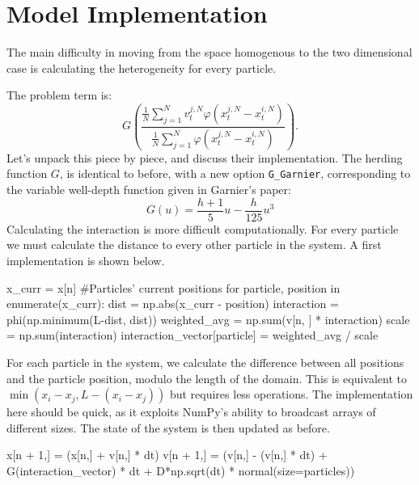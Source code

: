 \documentclass[11pt,a4paper, dvipsnames]{article}
\begin{document}
    \section{Model Implementation}
        The main difficulty in moving from the space homogenous to the two dimensional case is calculating the heterogeneity for every particle.
        
        The problem term is:
        \begin{equation}\label{interaction}
            G\left(\frac{\frac{1}{N}\sum_{j=1}^N v_t^{j,N}\varphi(x^{j,N}_t-x^{i,N}_t)}{\frac{1}{N}\sum_{j=1}^N \varphi(x^{j,N}_t-x^{i,N}_t)}\right).
        \end{equation}
        Let's unpack this piece by piece, and discuss their implementation. The herding function $G$, is identical to before, with a new option \texttt{G\_Garnier}, corresponding to the variable well-depth function given in Garnier's paper:
        $$G(u) = \frac{h+1}{5}u - \frac{h}{125} u^3$$
        Calculating the interaction is more difficult computationally. For every particle we must calculate the distance to every other particle in the system. A first implementation is shown below.

        \begin{python}
x_curr = x[n] #Particles' current positions
   for particle, position in enumerate(x_curr):
       dist = np.abs(x_curr - position)
       interaction = phi(np.minimum(L-dist, dist))
       weighted_avg = np.sum(v[n, ] * interaction)
       scale = np.sum(interaction)
       interaction_vector[particle] = weighted_avg / scale
        \end{python}
        For each particle in the system, we calculate the difference between all positions and the particle position, modulo the length of the domain. This is equivalent to $\min(x_i-x_j, L-(x_i-x_j))$ but requires less operations. The implementation here should be quick, as it exploits NumPy's ability to broadcast arrays of different sizes. The state of the system is then updated as before.
        \begin{python}
x[n + 1,] = (x[n,] + v[n,] * dt) %
v[n + 1,] = (v[n,] - (v[n,] * dt) + G(interaction_vector) * dt
            + D*np.sqrt(dt) * normal(size=particles))
        \end{python}
        
\end{document}
